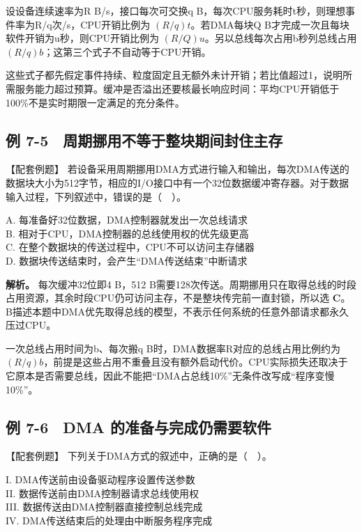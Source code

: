 \begin{methodbox}

设设备连续速率为R B/s，接口每次可交换q B，每次CPU服务耗时t秒，则理想事件率为R/q次/s，CPU开销比例为 \((R/q)t\)。若DMA每块Q B才完成一次且每块软件开销为u秒，则CPU开销比例为 \((R/Q)u\)。另以总线每次占用b秒列总线占用 \((R/q)b\)；这第三个式子不自动等于CPU开销。

\end{methodbox}

这些式子都先假定事件持续、粒度固定且无额外未计开销；若比值超过1，说明所需服务能力超过预算。缓冲是否溢出还要核最长响应时间：平均CPU开销低于100\%不是实时期限一定满足的充分条件。

\subsection{例 7-5　周期挪用不等于整块期间封住主存}\label{CO07-example-5}

【配套例题】 若设备采用周期挪用DMA方式进行输入和输出，每次DMA传送的数据块大小为512字节，相应的I/O接口中有一个32位数据缓冲寄存器。对于数据输入过程，下列叙述中，错误的是（　）。

A. 每准备好32位数据，DMA控制器就发出一次总线请求\\
B. 相对于CPU，DMA控制器的总线使用权的优先级更高\\
C. 在整个数据块的传送过程中，CPU不可以访问主存储器\\
D. 数据块传送结束时，会产生``DMA传送结束''中断请求

\textbf{解析。} 每次缓冲32位即4 B，512 B需要128次传送。周期挪用只在取得总线的时段占用资源，其余时段CPU仍可访问主存，不是整块传完前一直封锁，所以选 \textbf{C}。B描述本题中DMA优先取得总线的模型，不表示任何系统的任意外部请求都永久压过CPU。

一次总线占用时间为b、每次搬q B时，DMA数据率R对应的总线占用比例约为 \((R/q)b\)，前提是这些占用不重叠且没有额外启动代价。CPU实际损失还取决于它原本是否需要总线，因此不能把``DMA占总线10\%''无条件改写成``程序变慢10\%''。

\subsection{例 7-6　DMA 的准备与完成仍需要软件}\label{CO07-example-6}

【配套例题】 下列关于DMA方式的叙述中，正确的是（　）。

I. DMA传送前由设备驱动程序设置传送参数\\
II. 数据传送前由DMA控制器请求总线使用权\\
III. 数据传送由DMA控制器直接控制总线完成\\
IV. DMA传送结束后的处理由中断服务程序完成

